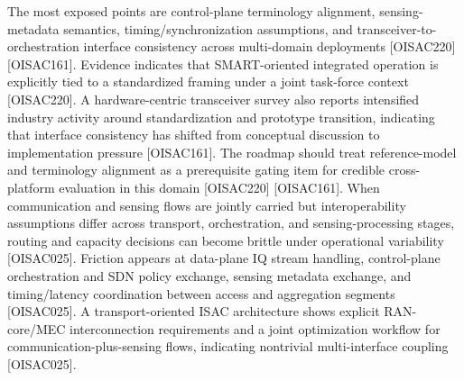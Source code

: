 {} The most exposed points are control-plane terminology alignment, sensing-metadata semantics, timing/synchronization assumptions, and transceiver-to-orchestration interface consistency across multi-domain deployments [O\markdownRendererUnderscore{}ISAC\markdownRendererUnderscore{}220] [O\markdownRendererUnderscore{}ISAC\markdownRendererUnderscore{}161].\markdownRendererParagraphSeparator
{} Evidence indicates that SMART-oriented integrated operation is explicitly tied to a standardized framing under a joint task-force context [O\markdownRendererUnderscore{}ISAC\markdownRendererUnderscore{}220]. A hardware-centric transceiver survey also reports intensified industry activity around standardization and prototype transition, indicating that interface consistency has shifted from conceptual discussion to implementation pressure [O\markdownRendererUnderscore{}ISAC\markdownRendererUnderscore{}161].\markdownRendererParagraphSeparator
{} The roadmap should treat reference-model and terminology alignment as a prerequisite gating item for credible cross-platform evaluation in this domain [O\markdownRendererUnderscore{}ISAC\markdownRendererUnderscore{}220] [O\markdownRendererUnderscore{}ISAC\markdownRendererUnderscore{}161].\markdownRendererInterblockSeparator
{}
\markdownRendererSectionEnd \markdownRendererSectionBegin
{}\markdownRendererInterblockSeparator
{} When communication and sensing flows are jointly carried but interoperability assumptions differ across transport, orchestration, and sensing-processing stages, routing and capacity decisions can become brittle under operational variability [O\markdownRendererUnderscore{}ISAC\markdownRendererUnderscore{}025].\markdownRendererParagraphSeparator
{} Friction appears at data-plane IQ stream handling, control-plane orchestration and SDN policy exchange, sensing metadata exchange, and timing/latency coordination between access and aggregation segments [O\markdownRendererUnderscore{}ISAC\markdownRendererUnderscore{}025].\markdownRendererParagraphSeparator
{} A transport-oriented ISAC architecture shows explicit RAN-core/MEC interconnection requirements and a joint optimization workflow for communication-plus-sensing flows, indicating nontrivial multi-interface coupling [O\markdownRendererUnderscore{}ISAC\markdownRendererUnderscore{}025].\markdownRendererParagraphSeparator
